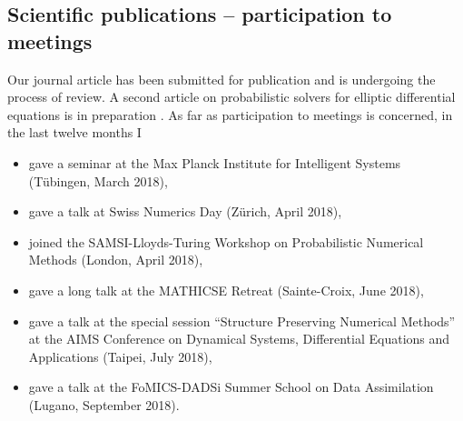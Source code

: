 \documentclass{article}
\theoremstyle{theorem}
\theoremstyle{definition}
\begin{document}
	\subsection*{Scientific publications -- participation to meetings}
	
	Our journal article \cite{AbG18} has been submitted for publication and is undergoing the process of review. A second article on probabilistic solvers for elliptic differential equations is in preparation \cite{AbG19}. As far as participation to meetings is concerned, in the last twelve months I
	\begin{itemize}[label=-]
		\item gave a seminar at the Max Planck Institute for Intelligent Systems (Tübingen, March 2018),
		\item gave a talk at Swiss Numerics Day (Zürich, April 2018),
		\item joined the SAMSI-Lloyds-Turing Workshop on Probabilistic Numerical Methods (London, April 2018),
		\item gave a long talk at the MATHICSE Retreat (Sainte-Croix, June 2018), 
		\item gave a talk at the special session ``Structure Preserving Numerical Methods'' at the AIMS Conference on Dynamical Systems, Differential Equations and Applications (Taipei, July 2018),
		\item gave a talk at the FoMICS-DADSi Summer School on Data Assimilation (Lugano, September 2018).
	\end{itemize}	

	
	
\end{document}
